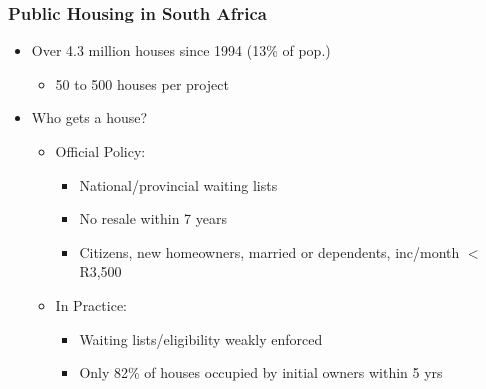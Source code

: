 \documentclass[aspectratio=149]{beamer}
\begin{document}
\begin{frame}
\frametitle{Public Housing in South Africa}
  \begin{itemize}
      \item Over 4.3 million houses since 1994 (13\% of pop.)
      \begin{itemize}
        \item 50 to 500 houses per project
      \end{itemize}
  \end{itemize}


\begin{itemize}
        \item Who gets a house?
      \begin{itemize}
        \item Official Policy: 
          \begin{itemize}
            \item National/provincial waiting lists
            \item No resale within 7 years
            \item Citizens, new homeowners, married or dependents, inc/month $<$R3,500
          \end{itemize}
        \item In Practice:
          \begin{itemize}
            \item Waiting lists/eligibility weakly enforced
            \item Only 82\% of houses occupied by initial owners within 5 yrs
          \end{itemize}
      \end{itemize}
\end{itemize}
\end{frame}

\end{document}
